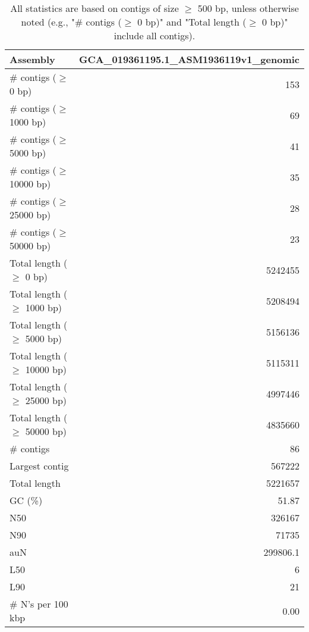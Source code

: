 \documentclass[12pt,a4paper]{article}
\begin{document}
\begin{table}[ht]
\begin{center}
\caption{All statistics are based on contigs of size $\geq$ 500 bp, unless otherwise noted (e.g., "\# contigs ($\geq$ 0 bp)" and "Total length ($\geq$ 0 bp)" include all contigs).}
\begin{tabular}{|l*{1}{|r}|}
\hline
Assembly & GCA\_019361195.1\_ASM1936119v1\_genomic \\ \hline
\# contigs ($\geq$ 0 bp) & 153 \\ \hline
\# contigs ($\geq$ 1000 bp) & 69 \\ \hline
\# contigs ($\geq$ 5000 bp) & 41 \\ \hline
\# contigs ($\geq$ 10000 bp) & 35 \\ \hline
\# contigs ($\geq$ 25000 bp) & 28 \\ \hline
\# contigs ($\geq$ 50000 bp) & 23 \\ \hline
Total length ($\geq$ 0 bp) & 5242455 \\ \hline
Total length ($\geq$ 1000 bp) & 5208494 \\ \hline
Total length ($\geq$ 5000 bp) & 5156136 \\ \hline
Total length ($\geq$ 10000 bp) & 5115311 \\ \hline
Total length ($\geq$ 25000 bp) & 4997446 \\ \hline
Total length ($\geq$ 50000 bp) & 4835660 \\ \hline
\# contigs & 86 \\ \hline
Largest contig & 567222 \\ \hline
Total length & 5221657 \\ \hline
GC (\%) & 51.87 \\ \hline
N50 & 326167 \\ \hline
N90 & 71735 \\ \hline
auN & 299806.1 \\ \hline
L50 & 6 \\ \hline
L90 & 21 \\ \hline
\# N's per 100 kbp & 0.00 \\ \hline
\end{tabular}
\end{center}
\end{table}
\end{document}
